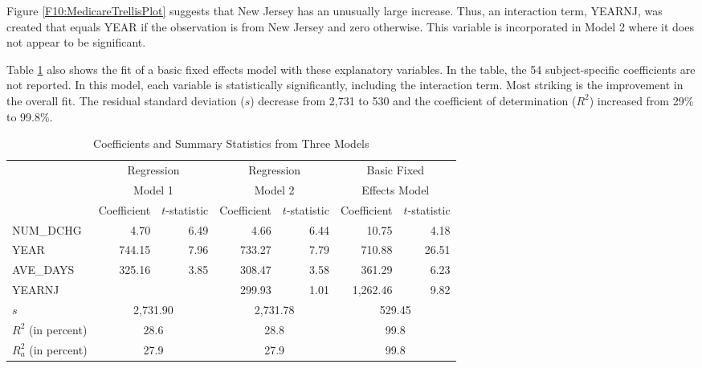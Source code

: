 Figure \ref{F10:MedicareTrellisPlot} suggests that New Jersey has an
unusually large increase. Thus, an interaction term, YEARNJ, was
created that equals YEAR if the observation is from New Jersey and
zero otherwise. This variable is incorporated in Model 2 where it
does not appear to be significant.

Table \ref{T10:MedicareRegression} also shows the fit of a basic
fixed effects model with these explanatory variables. In the table,
the 54 subject-specific coefficients are not reported. In this
model, each variable is statistically significantly, including the
interaction term. Most striking is the improvement in the overall
fit. The residual standard deviation ($s$) decrease from 2,731 to
530 and the coefficient of determination ($R^2$) increased from 29\%
to 99.8\%.



\begin{table}[h]
 \caption{\label{T10:MedicareRegression} \small
Coefficients and Summary Statistics from Three Models}
\begin{tabular}{lrrrrrr}
\hline
 &\multicolumn{2}{c}{Regression}&\multicolumn{2}{c}{Regression}&\multicolumn{2}{c}{Basic Fixed} \\
 &\multicolumn{2}{c}{Model 1} &\multicolumn{2}{c}{Model 2}
 &\multicolumn{2}{c}{Effects Model} \\
 & Coefficient & $t$-statistic &Coefficient & $t$-statistic &Coefficient & $t$-statistic
 \\
 \hline
  NUM\_DCHG &       4.70 &       6.49 &       4.66 &       6.44 &      10.75 &       4.18 \\
      YEAR &     744.15 &       7.96 &     733.27 &       7.79 &     710.88 &      26.51 \\
  AVE\_DAYS &     325.16 &       3.85 &     308.47 &       3.58 &     361.29 &       6.23 \\
      YEARNJ &            &            &     299.93 &       1.01 &   1,262.46 &       9.82 \\
      \hline
     $s$ &   \multicolumn{2}{c}{2,731.90} &  \multicolumn{2}{c}{2,731.78} &  \multicolumn{2}{c}{529.45}            \\
        $R^2$ (in percent) &  \multicolumn{2}{c}{28.6} &  \multicolumn{2}{c}{28.8} & \multicolumn{2}{c}{99.8}        \\
        $R_a^2$ (in percent) &  \multicolumn{2}{c}{27.9} &  \multicolumn{2}{c}{27.9} & \multicolumn{2}{c}{99.8}        \\
        \hline
\end{tabular}
\end{table}


